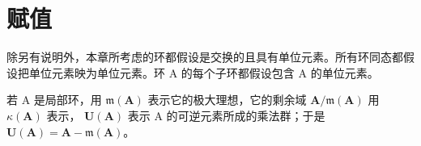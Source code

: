 \chapter{赋值}

除另有说明外，本章所考虑的环都假设是交换的且具有单位元素。所有环同态都假设把单位元素映为单位元素。环 A 的每个子环都假设包含 A 的单位元素。

若 A 是局部环，用 \(\mathfrak{m}(\mathbf{A})\) 表示它的极大理想，它的剩余域 \(\mathbf{A}/\mathfrak{m}(\mathbf{A})\) 用 \(\kappa(\mathbf{A})\) 表示， \(\mathbf{U}(\mathbf{A})\) 表示 A 的可逆元素所成的乘法群；于是 \(\mathbf{U}(\mathbf{A}) = \mathbf{A} - \mathfrak{m}(\mathbf{A})\)。

